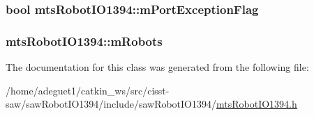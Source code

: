 \hypertarget{classmts_robot_i_o1394_a626f9d05e25b4c61c71bb215d75ffcc0}{
\subsubsection[{m\-Port\-Exception\-Flag}]{\setlength{\rightskip}{0pt plus 5cm}bool mts\-Robot\-I\-O1394\-::m\-Port\-Exception\-Flag\hspace{0.3cm}{\ttfamily [protected]}}}\label{classmts_robot_i_o1394_a626f9d05e25b4c61c71bb215d75ffcc0}
\hypertarget{classmts_robot_i_o1394_a267e4918bbef8f40fcedffe3a9a6204d}{
\subsubsection[{m\-Robots}]{ mts\-Robot\-I\-O1394\-::m\-Robots\hspace{0.3cm}{\ttfamily [protected]}}}\label{classmts_robot_i_o1394_a267e4918bbef8f40fcedffe3a9a6204d}


The documentation for this class was generated from the following file\-:\begin{DoxyCompactItemize}
\item 
/home/adeguet1/catkin\-\_\-ws/src/cisst-\/saw/saw\-Robot\-I\-O1394/include/saw\-Robot\-I\-O1394/\hyperlink{mts_robot_i_o1394_8h}{mts\-Robot\-I\-O1394.\-h}\end{DoxyCompactItemize}
